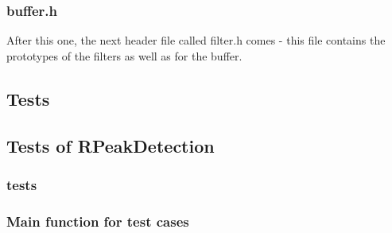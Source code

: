 \documentclass[12pt,a4paper]{article}
\begin{document}
\subsubsection{buffer.h}
	After this one, the next header file called filter.h comes - this file contains the prototypes of the filters as well as for the buffer.\\
	
\subsection{Tests}
\subsection{Tests of RPeakDetection}
%	
\subsubsection{tests}
%	
\subsubsection{Main function for test cases}
%	
\end{document}
